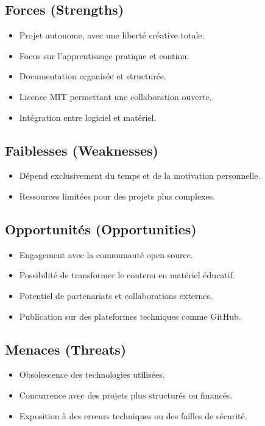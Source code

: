 \documentclass[10pt, a4paper, oneside]{article}
\begin{document}
\subsection*{Forces (Strengths)}
\begin{itemize}
  \item Projet autonome, avec une liberté créative totale.
  \item Focus sur l’apprentissage pratique et continu.
  \item Documentation organisée et structurée.
  \item Licence MIT permettant une collaboration ouverte.
  \item Intégration entre logiciel et matériel.
\end{itemize}

\subsection*{Faiblesses (Weaknesses)}
\begin{itemize}
  \item Dépend exclusivement du temps et de la motivation personnelle.
  \item Ressources limitées pour des projets plus complexes.
\end{itemize}

\subsection*{Opportunités (Opportunities)}
\begin{itemize}
  \item Engagement avec la communauté open source.
  \item Possibilité de transformer le contenu en matériel éducatif.
  \item Potentiel de partenariats et collaborations externes.
  \item Publication sur des plateformes techniques comme GitHub.
\end{itemize}

\subsection*{Menaces (Threats)}
\begin{itemize}
  \item Obsolescence des technologies utilisées.
  \item Concurrence avec des projets plus structurés ou financés.
  \item Exposition à des erreurs techniques ou des failles de sécurité.
\end{itemize}
\end{document}
